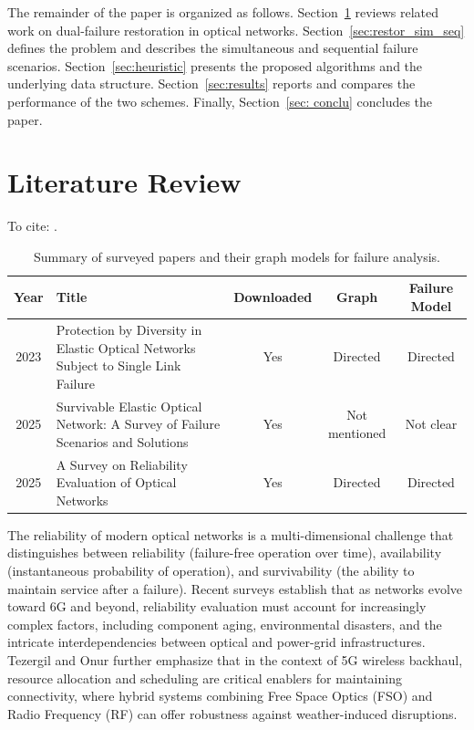 \documentclass[conference]{IEEEtran}
\begin{document}
The remainder of the paper is organized as follows. Section~\ref{sec:literature} reviews related work on dual-failure restoration in optical networks. Section~\ref{sec:restor_sim_seq} defines the problem and describes the simultaneous and sequential failure scenarios. Section~\ref{sec:heuristic} presents the proposed algorithms and the underlying data structure. Section~\ref{sec:results} reports and compares the performance of the two schemes. Finally, Section~\ref{sec: conclu} concludes the paper.


\section{Literature Review}
\label{sec:literature}

To cite: \cite{Zhao_2026, Sarma2025Survivable, Assis2023Protection, Arpanaei_2022, Choi_2002, Junior_2025, Khlifi_2025, Yuksel_2010}.

\begin{table}[ht]
\centering
\caption{Summary of surveyed papers and their graph models for failure analysis.}
\label{tab:failure_survey}
\begin{tabular}{c p{7cm} c c c}
\toprule
\textbf{Year} & \textbf{Title} & \textbf{Downloaded} & \textbf{Graph} & \textbf{Failure Model} \\
\midrule
2023 &
Protection by Diversity in Elastic Optical Networks Subject to Single Link Failure &
Yes &
Directed &
Directed \\
2025 &
Survivable Elastic Optical Network: A Survey of Failure Scenarios and Solutions &
Yes &
Not mentioned &
Not clear \\

2025 &
A Survey on Reliability Evaluation of Optical Networks &
Yes &
Directed &
Directed \\
\bottomrule
\end{tabular}
\end{table}

The reliability of modern optical networks is a multi-dimensional challenge that distinguishes between reliability (failure-free operation over time), availability (instantaneous probability of operation), and survivability (the ability to maintain service after a failure). Recent surveys establish that as networks evolve toward 6G and beyond, reliability evaluation must account for increasingly complex factors, including component aging, environmental disasters, and the intricate interdependencies between optical and power-grid infrastructures. Tezergil and Onur \cite{tezergil2022wireless} further emphasize that in the context of 5G wireless backhaul, resource allocation and scheduling are critical enablers for maintaining connectivity, where hybrid systems combining Free Space Optics (FSO) and Radio Frequency (RF) can offer robustness against weather-induced disruptions.
\end{document}
